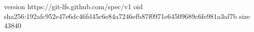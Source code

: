 version https://git-lfs.github.com/spec/v1
oid sha256:192afc952e47e6dc46fd45c6e84a7246efb87f0971e64509689c6fe981a3af7b
size 43840
